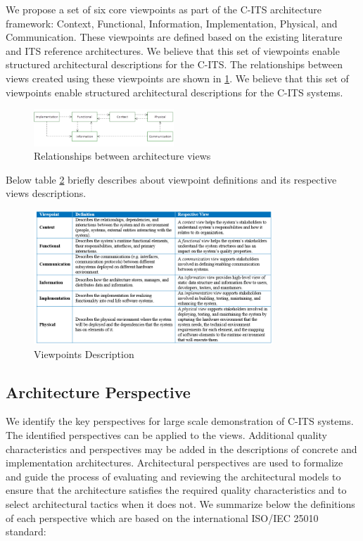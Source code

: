 \documentclass[letterpaper, 10 pt, conference]{ieeeconf}  %
\begin{document}
We propose a set of six core viewpoints as part of the C-ITS architecture framework: Context, Functional, Information, Implementation, Physical, and Communication. These viewpoints are defined based on the existing literature and ITS reference architectures. We believe that this set of viewpoints enable structured architectural descriptions for the C-ITS. The relationships between views created using these viewpoints are shown in \ref{views_rel}. We believe that this set of viewpoints enable structured architectural descriptions for the C-ITS systems.

\begin{figure}[ht!]
	\centering
	\includegraphics[width=0.47\textwidth]{views_rel}
	\caption{Relationships between architecture views}
	\label{views_rel}
	\centering
\end{figure}

Below table \ref{viewpoint_desc} briefly describes about viewpoint definitions and its respective views descriptions.

\begin{figure}[t!]
	\centering
	\includegraphics[width=0.80\textwidth]{viewpoint_desc}
	\caption{Viewpoints Description}
	\label{viewpoint_desc}
	\centering
\end{figure}


\subsection{Architecture Perspective}
We identify the key perspectives for large scale demonstration of C-ITS systems. The identified perspectives can be applied to the views. Additional quality characteristics and perspectives may be added in the descriptions of concrete and implementation architectures. Architectural perspectives are used to formalize and guide the process of evaluating and reviewing the architectural models to ensure that the architecture satisfies the required quality characteristics and to select architectural tactics when it does not.
We summarize below the definitions of each perspective which are based on the international ISO/IEC 25010 standard\cite{quality}:
\end{document}
